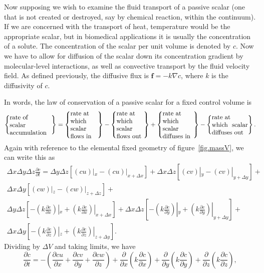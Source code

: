 \documentclass[twoside,11pt]		{report}
\begin{document}
Now supposing we wish to examine the fluid transport of a passive
scalar (\ie one that is not created or destroyed, say by chemical
reaction, within the continuum). If we are concerned with the
transport of heat, temperature would be the appropriate scalar, but in
biomedical applications it is usually the concentration of a
solute. The concentration of the scalar per unit volume is denoted by
$c$. Now we have to allow for diffusion of the scalar down its
concentration gradient by molecular-level interactions, as well as
convective transport by the fluid velocity field. As defined
previously, the diffusive flux is $\bm{f}=-k\nabla c$, where $k$ is
the diffusivity of $c$.

In words, the law of conservation of a passive
scalar for a fixed control volume is
\begin{equation}
\left\{ \parbox{23mm}{rate of\\ scalar\\ accumulation} \right\}=
\left\{ \parbox{15mm}{rate at\\ which scalar flows in} \right\}-
\left\{ \parbox{15mm}{rate at\\ which scalar flows out} \right\}+
\left\{ \parbox{17mm}{rate at\\ which scalar diffuses in} \right\}-
\left\{ \parbox{20mm}{rate at\\ which scalar diffuses out} \right\}.
\label{eq.scalar_bal_words}
\end{equation}
Again with reference to the elemental fixed geometry of
figure~\ref{fig.massV}, we can write this as
\begin{multline}
\Delta x\Delta y\Delta z\frac{\partial c}{\partial t}=
\Delta y\Delta z\left[(c u)|_{x}-(c u)|_{x+\Delta x}\right]+
\Delta x\Delta z\left[(c v)|_{y}-(c v)|_{y+\Delta y}\right]+\\
\Delta x\Delta y\left[(c w)|_{z}-(c w)|_{z+\Delta z}\right]+\\
\Delta y\Delta z\left[-(k \frac{\partial c}{\partial x})|_{x}+(k
  \frac{\partial c}{\partial x})|_{x+\Delta x}\right]+
\Delta x\Delta z\left[-(k \frac{\partial c}{\partial y})|_{y}+(k
  \frac{\partial c}{\partial y})|_{y+\Delta y}\right]+\\
\Delta x\Delta y\left[-(k \frac{\partial c}{\partial z})|_{z}+(k
  \frac{\partial c}{\partial z})|_{z+\Delta y}\right].
\end{multline}
Dividing by $\Delta V$ and taking limits, we have
\begin{equation}
\frac{\partial c}{\partial t}=
-\left(\frac{\partial cu}{\partial x}+\frac{\partial cv}{\partial
  y}+\frac{\partial cw}{\partial z}\right) + \frac{\partial}{\partial
  x}\left(k\frac{\partial c}{\partial x}\right)+ \frac{\partial}{\partial
  y}\left(k\frac{\partial c}{\partial y}\right)+ \frac{\partial}{\partial
  z}\left(k\frac{\partial c}{\partial z}\right),
\end{equation}
\end{document}
